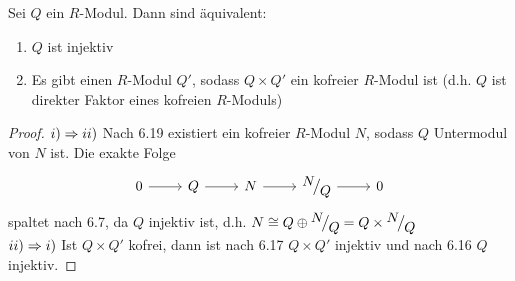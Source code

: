 \begin{fo}\label{6.20}
	Sei $Q$ ein $R$-Modul. Dann sind äquivalent:
	\begin{enumerate}[label= \roman*)]
		\item $Q$ ist injektiv
		\item Es gibt einen $R$-Modul $Q'$, sodass $Q \times Q'$ ein kofreier $R$-Modul ist (d.h. $Q$ ist direkter Faktor eines kofreien $R$-Moduls)
	\end{enumerate}
\end{fo}
\begin{proof}
	$i) \Rightarrow ii)$ Nach 6.19 existiert ein kofreier $R$-Modul $N$, sodass $Q$ Untermodul von $N$ ist. Die exakte Folge 
	$$\begin{tikzcd}
	0 \arrow{r} & Q \arrow{r} & N \arrow{r} & \QR{N}{Q} \arrow{r} & 0
	\end{tikzcd}$$
	spaltet nach 6.7, da $Q$ injektiv ist, d.h. $N \cong Q \oplus \QR{N}{Q}  = Q \times \QR{N}{Q}$\\
	$ii) \Rightarrow i)$ Ist $Q\times Q'$ kofrei, dann ist nach 6.17 $Q \times Q'$ injektiv und nach 6.16 $Q$ injektiv.
\end{proof}
\newpage
